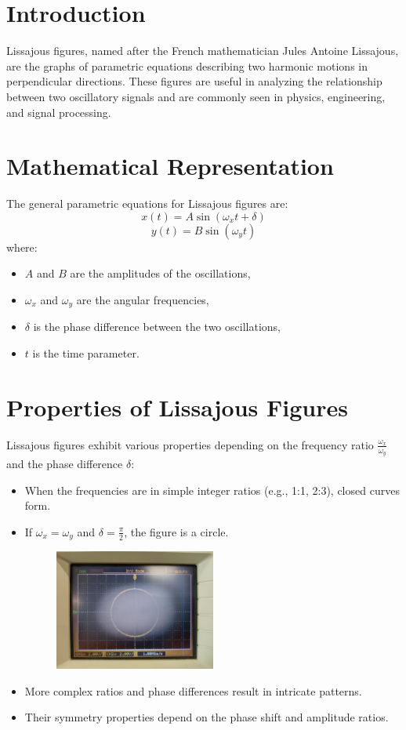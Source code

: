 \documentclass{article}
\begin{document}
\section{Introduction}
Lissajous figures, named after the French mathematician Jules Antoine Lissajous, are the graphs of parametric equations describing two harmonic motions in perpendicular directions. These figures are useful in analyzing the relationship between two oscillatory signals and are commonly seen in physics, engineering, and signal processing.

\section{Mathematical Representation}
The general parametric equations for Lissajous figures are:
\begin{equation}
x(t) = A \sin(\omega_x t + \delta)
\end{equation}
\begin{equation}
y(t) = B \sin(\omega_y t)
\end{equation}
where:
\begin{itemize}
\item $A$ and $B$ are the amplitudes of the oscillations,
\item $\omega_x$ and $\omega_y$ are the angular frequencies,
\item $\delta$ is the phase difference between the two oscillations,
\item $t$ is the time parameter.
\end{itemize}

\section{Properties of Lissajous Figures}
Lissajous figures exhibit various properties depending on the frequency ratio $\frac{\omega_x}{\omega_y}$ and the phase difference $\delta$:
\begin{itemize}
\item When the frequencies are in simple integer ratios (e.g., 1:1, 2:3), closed curves form.
\item If $\omega_x = \omega_y$ and $\delta = \frac{\pi}{2}$, the figure is a circle.

\begin{figure}[H]
\centering
\includegraphics[width=0.5\textwidth]{figs/fig.png}
\end{figure}

\item More complex ratios and phase differences result in intricate patterns.
\item Their symmetry properties depend on the phase shift and amplitude ratios.
\end{itemize}
\end{document}

